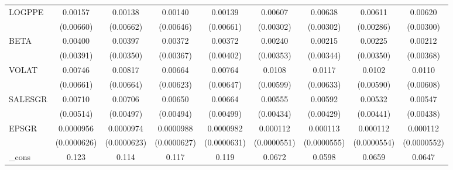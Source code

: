 \begin{table}[htbp]
\begin{tabular}{l*{8}{c}}
LOGPPE              &     0.00157         &     0.00138         &     0.00140         &     0.00139         &     0.00607\sym{*}  &     0.00638\sym{*}  &     0.00611\sym{*}  &     0.00620\sym{*}  \\
                    &   (0.00660)         &   (0.00662)         &   (0.00646)         &   (0.00661)         &   (0.00302)         &   (0.00302)         &   (0.00286)         &   (0.00300)         \\
BETA                &     0.00400         &     0.00397         &     0.00372         &     0.00372         &     0.00240         &     0.00215         &     0.00225         &     0.00212         \\
                    &   (0.00391)         &   (0.00350)         &   (0.00367)         &   (0.00402)         &   (0.00353)         &   (0.00344)         &   (0.00350)         &   (0.00368)         \\
VOLAT               &     0.00746         &     0.00817         &     0.00664         &     0.00764         &      0.0108\sym{*}  &      0.0117\sym{*}  &      0.0102         &      0.0110\sym{*}  \\
                    &   (0.00661)         &   (0.00664)         &   (0.00623)         &   (0.00647)         &   (0.00599)         &   (0.00633)         &   (0.00590)         &   (0.00608)         \\
SALESGR             &     0.00710         &     0.00706         &     0.00650         &     0.00664         &     0.00555         &     0.00592         &     0.00532         &     0.00547         \\
                    &   (0.00514)         &   (0.00497)         &   (0.00494)         &   (0.00499)         &   (0.00434)         &   (0.00429)         &   (0.00441)         &   (0.00438)         \\
EPSGR               &   0.0000956         &   0.0000974         &   0.0000988         &   0.0000982         &    0.000112\sym{*}  &    0.000113\sym{*}  &    0.000112\sym{*}  &    0.000112\sym{*}  \\
                    & (0.0000626)         & (0.0000623)         & (0.0000627)         & (0.0000631)         & (0.0000551)         & (0.0000555)         & (0.0000554)         & (0.0000552)         \\
\_cons              &       0.123\sym{**} &       0.114\sym{*}  &       0.117\sym{*}  &       0.119\sym{*}  &      0.0672         &      0.0598         &      0.0659         &      0.0647         \\

\end{tabular}
\end{table}
